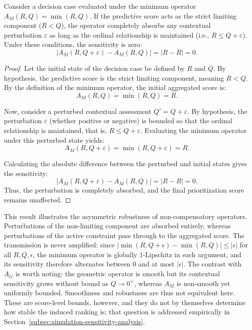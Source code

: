 \documentclass[mathematics,article,submit,moreauthors]{Definitions/mdpi}
\begin{document}
\begin{Corollary}
    \label{cor:min-noise}
    Consider a decision case evaluated under the minimum operator $A_M(R,Q) = \min(R,Q)$. If the predictive score acts as the strict limiting component ($R < Q$), the operator completely absorbs any contextual perturbation $\varepsilon$ as long as the ordinal relationship is maintained (i.e., $R \le Q + \varepsilon$). Under these conditions, the sensitivity is zero:
    $$ \bigl| A_M(R, Q+\varepsilon) - A_M(R, Q) \bigr| = |R - R| = 0. $$
\end{Corollary}
\begin{proof}
    Let the initial state of the decision case be defined by $R$ and $Q$. By hypothesis, the predictive score is the strict limiting component, meaning $R < Q$. By the definition of the minimum operator, the initial aggregated score is:
    $$ A_M(R, Q) = \min(R, Q) = R. $$
    
    Now, consider a perturbed contextual assessment $Q' = Q + \varepsilon$. {\color{teal}By hypothesis, the perturbation $\varepsilon$ (whether positive or negative) is bounded so that the ordinal relationship is maintained, that is, $R \le Q + \varepsilon$.} Evaluating the minimum operator under this perturbed state yields:
    $$ A_M(R, Q+\varepsilon) = \min(R, Q+\varepsilon) = R. $$
    
    Calculating the absolute difference between the perturbed and initial states gives the sensitivity:
    $$ \bigl| A_M(R, Q+\varepsilon) - A_M(R, Q) \bigr| = | R - R | = 0. $$
    Thus, the perturbation is completely absorbed, and the final prioritization score remains unaffected.
\end{proof}

{\color{teal}This result illustrates the asymmetric robustness of
non-compensatory operators. Perturbations of the non-limiting component are
absorbed entirely, whereas perturbations of the active constraint pass
through to the aggregated score. The transmission is never amplified: since
$|\min(R,Q+\epsilon)-\min(R,Q)|\le|\epsilon|$ for all $R,Q,\epsilon$, the
minimum operator is globally $1$-Lipschitz in each argument, and its
sensitivity therefore alternates between $0$ and at most $|\epsilon|$. The
contrast with $A_G$ is worth noting: the geometric operator is smooth but
its contextual sensitivity grows without bound as $Q\to0^+$, whereas $A_M$
is non-smooth yet uniformly bounded. Smoothness and robustness are thus not
equivalent here. These are score-level bounds, however, and they do not by
themselves determine how stable the induced ranking is; that question is
addressed empirically in
Section~\ref{subsec:simulation-sensitivity-analysis}.}
\end{document}
